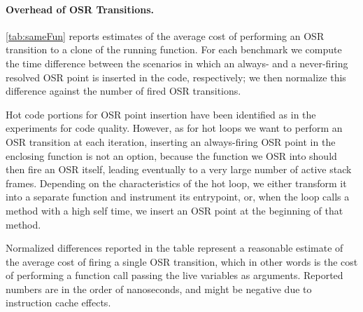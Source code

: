 \paragraph{Overhead of OSR Transitions.}

\mytable\ref{tab:sameFun} reports estimates of the average cost of performing an OSR transition to a clone of the running function. For each benchmark we compute the time difference between the scenarios in which an always- and a never-firing resolved OSR point is inserted in the code, respectively; we then normalize this difference against the number of fired OSR transitions.

Hot code portions for OSR point insertion have been identified as in the experiments for code quality. However, as for hot loops we want to perform an OSR transition at each iteration, inserting an always-firing OSR point in the enclosing function is not an option, because the function we OSR into should then fire an OSR itself, leading eventually to a very large number of active stack frames. Depending on the characteristics of the hot loop, we either transform it into a separate function and instrument its entrypoint, or, when the loop calls a method with a high self time, we insert an OSR point at the beginning of that method.

Normalized differences reported in the table represent a reasonable estimate of the average cost of firing a single OSR transition, which in other words is the cost of performing a function call passing the live variables as arguments. Reported numbers are in the order of nanoseconds, and might be negative due to instruction cache effects.

